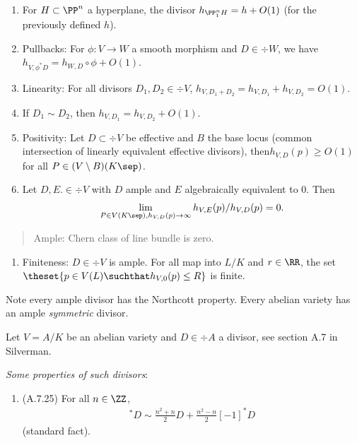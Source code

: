 \begin{enumerate}
\def\labelenumi{\alph{enumi}.}
\item
  For \(H \subset \PP^n\) a hyperplane, the divisor
  \(h_{\PP_1^n H} = h + O(1)\) (for the previously defined \(h\)).
\item
  Pullbacks: For \(\phi: V\to W\) a smooth morphism and \(D\in \div W\),
  we have \(h_{V, \phi^* D} = h_{W, D}\circ \phi + O(1)\).
\item
  Linearity: For all divisors \(D_1, D_2 \in \div V\),
  \(h_{V, D_1 + D_2} = h_{V, D_1} + h_{V, D_2} = O(1)\).
\item
  If \(D_1 \sim D_2\), then \(h_{V, D_1} = h_{V, D_2} + O(1)\).
\item
  Positivity: Let \(D\subset \div V\) be effective and \(B\) the base
  locus (common intersection of linearly equivalent effective divisors),
  then\(h_{V, D}(p) \geq O(1)\) for all \(P \in (V\setminus B)(K\sep)\).
\item
  Let \(D, E. \in \div V\) with \(D\) ample and \(E\) algebraically
  equivalent to \(0\). Then
  \begin{align*}
    \lim_{P \in V(K\sep), h_{V,D}(p) \to \infty} h_{V, E}(p) / h_{V,D}(p) = 0
    .\end{align*}
\end{enumerate}

\begin{quote}
Ample: Chern class of line bundle is zero.
\end{quote}

\begin{enumerate}
\def\labelenumi{\alph{enumi}.}
\setcounter{enumi}{6}
\tightlist
\item
  Finiteness: \(D \in \div V\) is ample. For all map into \(L/K\) and
  \(r\in \RR\), the set
  \(\theset{p\in V(L) \suchthat h_{V, 0}(p) \leq R }\) is finite.
\end{enumerate}

Note every ample divisor has the Northcott property. Every abelian
variety has an ample \emph{symmetric} divisor.

Let \(V = A/K\) be an abelian variety and \(D\in \div A\) a divisor, see
section A.7 in Silverman.

\emph{Some properties of such divisors}:

\begin{enumerate}
\def\labelenumi{\arabic{enumi}.}
\tightlist
\item
  (A.7.25) For all \(n\in \ZZ\),
  \begin{align*}
    [n]^* D \sim \frac{n^2 + n}{2}D + \frac{n^2 - n}{2} [-1]^*D
    \end{align*} (standard fact).
\end{enumerate}

